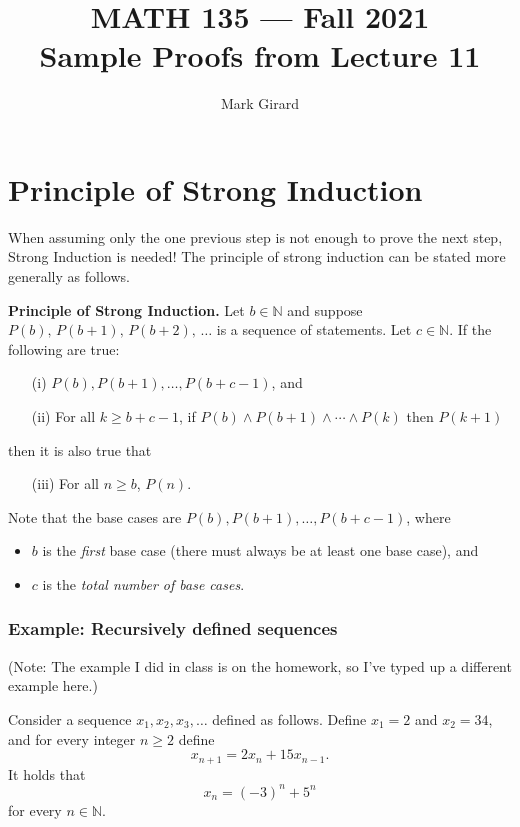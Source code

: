 \documentclass[11pt]{article}
\theoremstyle{plain}
\theoremstyle{plain}
\theoremstyle{remark}
\def\naturals{\mathbb{N}}
\begin{document}
\title{MATH 135 --- Fall 2021\\ Sample Proofs from Lecture 11}
\author{Mark Girard}

\maketitle

\section*{Principle of Strong Induction}
When assuming only the one previous step is not enough to prove the next step, Strong Induction is needed! 
The principle of strong induction can be stated more generally as follows.
\begin{tcolorbox}
\textbf{Principle of Strong Induction.}
Let $b\in\naturals$ and suppose $P(b),\, P(b+1),\, P(b+2),\, \dots$ is a sequence of statements. Let $c\in\naturals$. If the following are true:
\begin{itemize}
\item[(i)] $P(b),P(b+1),\dots,P(b+c-1)$, and
\item[(ii)] For all $k\geq b+c-1$, if $P(b)\wedge P(b+1) \wedge\cdots\wedge P(k)$ then $P(k+1)$
\end{itemize}
then it is also true that
\begin{itemize}
 \item[(iii)]For all $n\geq b$,  $P(n)$. 
\end{itemize}
\end{tcolorbox}
Note that the base cases are $P(b),P(b+1),\dots,P(b+c-1)$, where
\begin{itemize}
 \item $b$ is the \emph{first} base case (there must always be at least one base case), and 
 \item $c$ is the \emph{total number of base cases}.
\end{itemize}



\subsubsection*{Example: Recursively defined sequences}
(Note: The example I did in class is on the homework, so I've typed up a different example here.)
\begin{tcolorbox}
Consider a sequence $x_1,x_2,x_3,\dots$ defined as follows. Define $x_1=2$ and $x_2 = 34$, and for every integer $n\geq 2$ define
\[
 x_{n+1} = 2x_n + 15x_{n-1}.
\]
It holds that 
\[
 x_n = (-3)^n  + 5^{n} \tag{$\ast$}
\]
for every $n\in\naturals$.
\end{tcolorbox}
\end{document}
